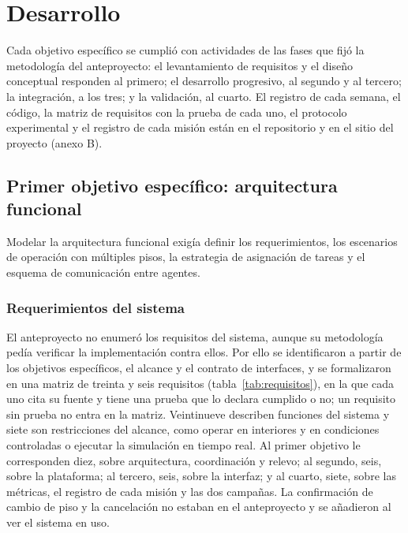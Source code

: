 \chapter{Desarrollo}
\label{cap:desarrollo}

Cada objetivo específico se cumplió con actividades de las fases que fijó la metodología del anteproyecto: el levantamiento de requisitos y el diseño conceptual responden al primero; el desarrollo progresivo, al segundo y al tercero; la integración, a los tres; y la validación, al cuarto. El registro de cada semana, el código, la matriz de requisitos con la prueba de cada uno, el protocolo experimental y el registro de cada misión están en el repositorio y en el sitio del proyecto (anexo B).

\section{Primer objetivo específico: arquitectura funcional}
\label{sec:oe1}

Modelar la arquitectura funcional exigía definir los requerimientos, los escenarios de operación con múltiples pisos, la estrategia de asignación de tareas y el esquema de comunicación entre agentes.

\subsection{Requerimientos del sistema}

El anteproyecto no enumeró los requisitos del sistema, aunque su metodología pedía verificar la implementación contra ellos. Por ello se identificaron a partir de los objetivos específicos, el alcance y el contrato de interfaces, y se formalizaron en una matriz de treinta y seis requisitos (tabla~\ref{tab:requisitos}), en la que cada uno cita su fuente y tiene una prueba que lo declara cumplido o no; un requisito sin prueba no entra en la matriz. Veintinueve describen funciones del sistema y siete son restricciones del alcance, como operar en interiores y en condiciones controladas o ejecutar la simulación en tiempo real. Al primer objetivo le corresponden diez, sobre arquitectura, coordinación y relevo; al segundo, seis, sobre la plataforma; al tercero, seis, sobre la interfaz; y al cuarto, siete, sobre las métricas, el registro de cada misión y las dos campañas. La confirmación de cambio de piso y la cancelación no estaban en el anteproyecto y se añadieron al ver el sistema en uso.


